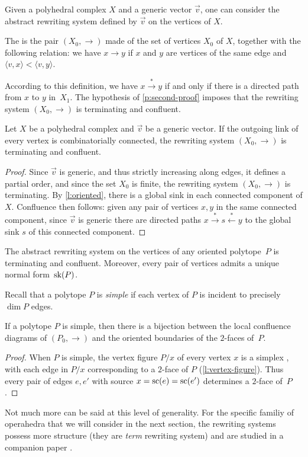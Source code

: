     Given a polyhedral complex $X$ and a generic vector $\vec v$, one can consider the abstract rewriting system defined by $\vec v$ on the vertices of $X$.
\begin{definition}
    The  is the pair $(X_0,\to)$ made of the set of vertices $X_0$ of $X$, together with the following relation: we have $x \to y$ if $x$ and $y$ are vertices of the same edge and $\langle v, x \rangle < \langle v, y \rangle$.
\end{definition}
According to this definition, we have $x \xrightarrow{*} y$ if and only if there is a directed path from $x$ to $y$ in~$X_1$. 
The hypothesis of \cref{p:second-proof} imposes that the rewriting system $(X_0,\to)$ is terminating and confluent.
\begin{proposition}
    \label{prop:terminating-confluent}
    Let $X$ be a polyhedral complex and $\vec v$ be a generic vector. 
    If the outgoing link of every vertex is combinatorially connected, the rewriting system $(X_0,\to)$ is terminating and confluent. 
\end{proposition}
\begin{proof}
    Since $\vec v$ is generic, and thus strictly increasing along edges, it defines a partial order, and since the set $X_0$ is finite, the rewriting system $(X_0,\to)$ is terminating.
    By \cref{l:oriented}, there is a global sink in each connected component of $X$.
    Confluence then follows: given any pair of vertices $x,y$ in the same connected component, since $\vec v$ is generic there are directed paths $x \xrightarrow{*} s \xleftarrow{*} y$ to the global sink $s$ of this connected component. 
\end{proof}
\begin{corollary}
    The abstract rewriting system on the vertices of any oriented polytope~$P$ is terminating and confluent.
    Moreover, every pair of vertices admits a unique normal form~$\mathrm{sk}(P)$.
\end{corollary}
Recall that a polytope $P$ is \emph{simple} if each vertex of $P$ is incident to precisely $\dim P$ edges.
\begin{lemma}
    \label{l:simple-local-diagrams}
    If a polytope $P$ is simple, then there is a bijection between the local confluence diagrams of $(P_0,\to)$ and the oriented boundaries of the $2$-faces of~$P$.
\end{lemma}
\begin{proof}
    When $P$ is simple, the vertex figure $P/x$ of every vertex $x$ is a simplex \cite[Prop.~2.16]{Ziegler95}, with each edge in $P/x$ corresponding to a $2$-face of $P$ (\cref{l:vertex-figure}). 
    Thus every pair of edges $e,e'$ with source $x=\mathrm{sc}(e)=\mathrm{sc}(e')$ determines a $2$-face of~$P$. 
\end{proof}
Not much more can be said at this level of generality. 
For the specific familiy of operahedra that we will consider in the next section, the rewriting systems possess more structure (they are \emph{term} rewriting system) and are studied in a companion paper \cite{CLA24}.

